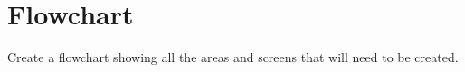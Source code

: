 \section{Flowchart} %
Create a flowchart showing all the areas and screens that will need to be
created.